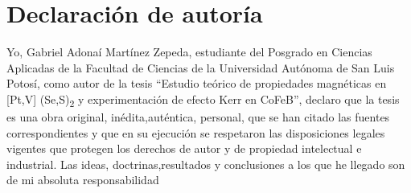 		\setcounter{page}{2}
\chapter*{\centering Declaraci\'on de autor\'ia}
Yo,  Gabriel Adona\'i Mart\'inez Zepeda, estudiante del Posgrado en Ciencias Aplicadas de la Facultad de Ciencias de la Universidad Autónoma de San Luis Potosí, como autor de la tesis “Estudio te\'orico de propiedades magn\'eticas en [Pt,V] (Se,S)\textsubscript{2} y experimentación de efecto Kerr en CoFeB”, declaro que la tesis es una obra original, inédita,auténtica, personal, que se han citado las fuentes correspondientes y que en su ejecución se respetaron las disposiciones legales vigentes que protegen los derechos  de  autor y  de  propiedad  intelectual  e  industrial.  Las  ideas,  doctrinas,resultados y conclusiones a los que he llegado son de mi absoluta responsabilidad